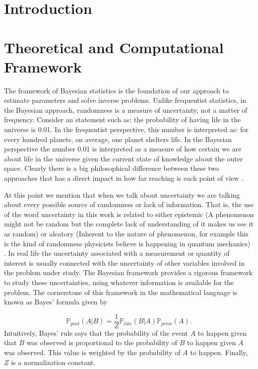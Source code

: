 \documentclass[12pt]{book}
\newcommand{\post}{\mathbb{P}_{post}}
\newcommand{\like}{\mathbb{P}_{like}}
\newcommand{\prior}{\mathbb{P}_{prior}}
\begin{document}
\chapter{Introduction}

\newpage

\chapter{Theoretical and Computational Framework}


The framework of Bayesian statistics is the foundation of  our approach to estimate parameters and solve 
inverse problems. Unlike frequentist statistics, in the Bayesian approach, randomness
is a measure of uncertainty,  not a matter of frequency. Consider an statement such  as:
the probability of having life in the universe is 0.01. In the frequentist
perspective, this number is interpreted as: for every hundred planets, on average, one planet shelters life.
 In the Bayesian
perspective the number 0.01 is interpreted as a measure of how certain we are about life in the universe
given the current state of knowledge about the outer space. 
Clearly there is a big philosophical
difference between these two approaches that has a direct impact in how far reaching is each point of view  \cite{jaynes2003probability}.


At this point we mention that when we talk about uncertainty we are talking about every possible 
source of randomness  or  lack of information. That is, the use of the word uncertainty in this work
is related to either epistemic (A phenomenon might not be random but the complete lack of 
understanding of it makes us see it as random) or aleatory (Inherent to the nature of phenomenon, for 
example this is the kind of randomness physicists believe is happening in quantum mechanics)
\cite{kennedy2001bayesian}. In real life the uncertainty associated with a  measurement or  quantity 
of interest is usually connected  with the uncertainty  of other variables involved in the problem under study. 
The Bayesian framework provides a rigorous framework to study these uncertainties, 
using whatever information is available for the problem. The cornerstone of this framework
in the mathematical language is known as   Bayes' formula given by

\begin{equation}\label{eqnBayes}
\post(A|B)=\frac{1}{Z}\like(B|A)\prior(A).
\end{equation}
Intuitively, Bayes' rule says that the probability of the event $A$ to happen given that $B$ was observed is
proportional to the probability of $B$ to happen given $A$ was observed. This value is weighted by 
the probability of $A$ to happen. Finally, $Z$ is a normalization constant.
\end{document}
